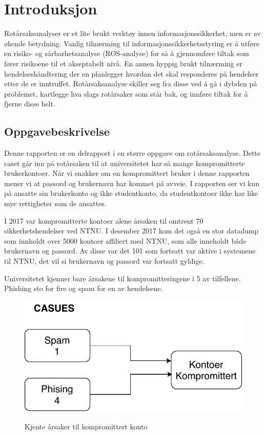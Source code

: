 \chapter{Introduksjon}
\fixme Rotårsaksanalyser er et lite brukt verktøy innen informasjonssikkerhet, men er av økende betydning. Vanlig tilnærming til informasjonssikkerhetsstyring er å utføre en risiko- og sårbarhetsanalyse (ROS-analyse) for så å gjennomføre tiltak som fører risikoene til et akseptabelt nivå. En annen hyppig brukt tilnærming er hendelseshåndtering der en planlegger hvordan det skal responderes på hendelser etter de er inntruffet. Rotårsaksanalyse skiller seg fra disse ved å gå i dybden på problemet, kartlegge hva slags rotårsaker som står bak, og innføre tiltak for å fjerne disse helt.

\section{Oppgavebeskrivelse}
Denne rapporten er en delrapport i en større oppgave om rotårsaksanalyse. Dette caset går inn på rotårsaken til at universitetet har så mange kompromitterte brukerkontoer. Når vi snakker om en kompromittert bruker i denne rapporten mener vi at passord og brukernavn har kommet på avveie. I rapporten ser vi kun på ansatte sin brukerkonto og ikke studentkonto, da studentkontoer ikke har like mye rettigheter som de ansattes.

I 2017 var kompromitterte kontoer alene årsaken til omtrent 70 sikkerhetshendelser ved NTNU. I desember 2017 kom det også en stor datadump som innholdt over 5000 kontoer affiliert med NTNU, som alle inneholdt både brukernavn og passord. Av disse var det 101 som fortsatt var aktive i systemene til NTNU, det vil si brukernavn og passord var fortsatt gyldige.

Universitetet kjenner bare årsakene til kompromitteringene i 5 av tilfellene. Phishing sto for fire og spam for en av hendelsene. 

\begin{figure}[H]
    \centering
    \includegraphics[scale=0.6]{case_2/bilder/kjente_arsaker.pdf}
    \label{fig:kjkk}
    \caption[kjente_årsaker_kompromittert_konto]{Kjente årsaker til kompromittert konto}
\end{figure}


